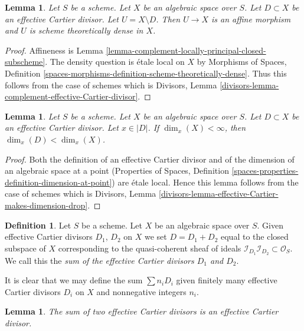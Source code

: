 \documentclass{stacks-project}
\theoremstyle{plain}
\newtheorem{lemma}[subsection]{Lemma}
\theoremstyle{definition}
\newtheorem{definition}[subsection]{Definition}
\theoremstyle{remark}
\numberwithin{equation}{subsection}
\begin{document}
\begin{lemma}
\label{lemma-complement-effective-Cartier-divisor}
Let $S$ be a scheme. Let $X$ be an algebraic space over $S$.
Let $D \subset X$ be an effective Cartier divisor.
Let $U = X \setminus D$. Then $U \to X$ is an affine morphism and $U$
is scheme theoretically dense in $X$.
\end{lemma}

\begin{proof}
Affineness is Lemma \ref{lemma-complement-locally-principal-closed-subscheme}.
The density question is \'etale local on $X$ by
Morphisms of Spaces, Definition
\ref{spaces-morphisms-definition-scheme-theoretically-dense}.
Thus this follows from the case of schemes which is
Divisors, Lemma
\ref{divisors-lemma-complement-effective-Cartier-divisor}.
\end{proof}

\begin{lemma}
\label{lemma-effective-Cartier-makes-dimension-drop}
Let $S$ be a scheme. Let $X$ be an algebraic space over $S$.
Let $D \subset X$ be an effective Cartier divisor.
Let $x \in |D|$.
If $\dim_x(X) < \infty$, then $\dim_x(D) < \dim_x(X)$.
\end{lemma}

\begin{proof}
Both the definition of an effective Cartier divisor and of the
dimension of an algebraic space at a point
(Properties of Spaces, Definition
\ref{spaces-properties-definition-dimension-at-point})
are \'etale local. Hence this lemma follows from the case of schemes
which is
Divisors, Lemma \ref{divisors-lemma-effective-Cartier-makes-dimension-drop}.
\end{proof}

\begin{definition}
\label{definition-sum-effective-Cartier-divisors}
Let $S$ be a scheme. Let $X$ be an algebraic space over $S$.
Given effective Cartier divisors
$D_1$, $D_2$ on $X$ we set $D = D_1 + D_2$ equal to the
closed subspace of $X$ corresponding to the quasi-coherent
sheaf of ideals
$\mathcal{I}_{D_1}\mathcal{I}_{D_2} \subset \mathcal{O}_S$.
We call this the {\it sum of the effective Cartier divisors
$D_1$ and $D_2$}.
\end{definition}

\noindent
It is clear that we may define the sum $\sum n_iD_i$ given
finitely many effective Cartier divisors $D_i$ on $X$
and nonnegative integers $n_i$.

\begin{lemma}
\label{lemma-sum-effective-Cartier-divisors}
The sum of two effective Cartier divisors is an effective
Cartier divisor.
\end{lemma}
\end{document}
